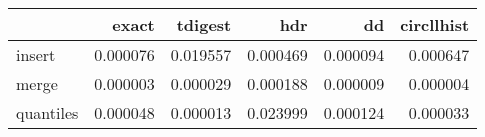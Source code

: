 \begin{tabular}{lrrrrr}
\toprule
{} &     exact &   tdigest &       hdr &        dd &  circllhist \\
\midrule
insert    &  0.000076 &  0.019557 &  0.000469 &  0.000094 &    0.000647 \\
merge     &  0.000003 &  0.000029 &  0.000188 &  0.000009 &    0.000004 \\
quantiles &  0.000048 &  0.000013 &  0.023999 &  0.000124 &    0.000033 \\
\bottomrule
\end{tabular}
